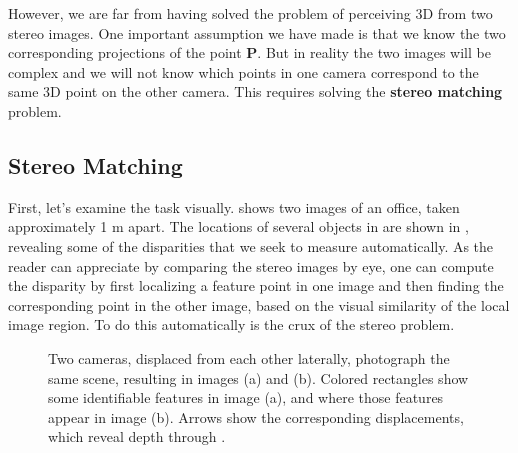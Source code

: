 However, we are far from having solved the problem of perceiving 3D from two stereo images. One important assumption we have made is that we know the two corresponding projections of the point $\mathbf{P}$. But in reality the two images will be complex and we will not know which points in one camera correspond to the same 3D point on the other camera. This requires solving the {\bf stereo matching} problem. 

\subsection{Stereo Matching}


First, let's examine the task visually.   \Fig{\ref{fig:stereomatch}} shows two images of an office, taken approximately 1 m apart.  The locations of several objects in  are shown in , revealing some of the disparities that we seek to measure automatically.  As the reader can appreciate by comparing the stereo images by eye, one can compute the disparity by first localizing a feature point in one image and then finding the corresponding point in the other image, based on the visual similarity of the local image region.  To do this automatically is the crux of the stereo problem.




\begin{figure}[t]
\centerline{
}
\caption{Two cameras, displaced from each other laterally, photograph the same scene, resulting in images (a) and (b).  Colored rectangles show some identifiable features in image (a), and where those features appear in image (b).  Arrows show the corresponding displacements, which reveal depth through \eqn{\ref{eq:depthFromDisparity}}.}
\label{fig:stereomatch}
\end{figure}




